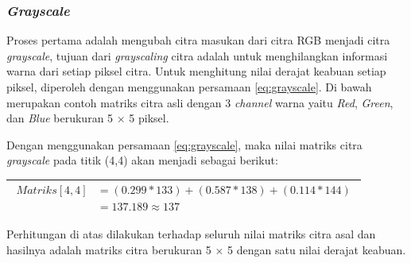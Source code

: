 \subsubsection{\textit{Grayscale}}
\noindent Proses pertama adalah mengubah citra masukan dari citra RGB menjadi citra \textit{grayscale}, tujuan dari \textit{grayscaling} citra adalah untuk menghilangkan informasi warna dari setiap piksel citra. Untuk menghitung nilai derajat keabuan setiap piksel, diperoleh dengan menggunakan persamaan \ref{eq:grayscale}.
\noindent Di bawah merupakan contoh matriks citra asli dengan 3 \textit{channel} warna yaitu \textit{Red}, \textit{Green}, dan \textit{Blue} berukuran 5 $\times$ 5 piksel. 

\begin{adjustbox}{width=1\textwidth}
	\noindent\begin{minipage}{\linewidth}
		\label{fig:MatriksCitraAsal}
	\end{minipage}
\end{adjustbox} 

\noindent Dengan menggunakan persamaan \ref{eq:grayscale}, maka nilai matriks citra \textit{grayscale} pada titik (4,4) akan menjadi sebagai berikut:
\begin{table}[H]
	\begin{adjustbox}{width=1\textwidth}
		\begin{tabular}{|p{13.55cm}|}
			\hline
			\begin{equation}\nonumber
			\begin{aligned}
			Matriks[4,4] &= (0.299 * 133) + (0.587 * 138) + (0.114 * 144) \\
						 &= 137.189 \approx 137 
			\end{aligned}
			\end{equation}\\
			\hline
		\end{tabular}
	\end{adjustbox}
\end{table}
\noindent Perhitungan di atas dilakukan terhadap seluruh nilai matriks citra asal dan hasilnya adalah matriks citra berukuran 5 $\times$ 5 dengan satu nilai derajat keabuan.

